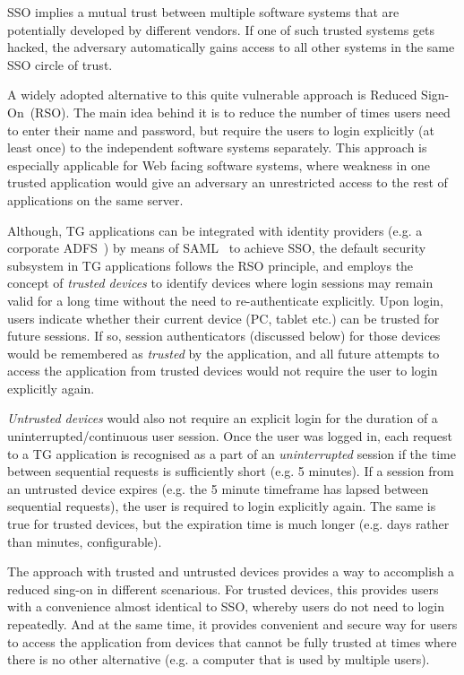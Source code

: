 \documentclass[a4paper,12pt,oneside,openright]{memoir}
\begin{document}
	SSO implies a mutual trust between multiple software systems that are potentially developed by different vendors.
	If one of such trusted systems gets hacked, the adversary automatically gains access to all other systems in the same SSO circle of trust.

	A widely adopted alternative to this quite vulnerable approach is Reduced Sign-On~(RSO).
	The main idea behind it is to reduce the number of times users need to enter their name and password, but require the users to login explicitly (at least once) to the independent software systems separately.
	This approach is especially applicable for Web facing software systems, where weakness in one trusted application would give an adversary an unrestricted access to the rest of applications on the same server.

	Although, TG applications can be integrated with identity providers (e.g. a corporate ADFS~\cite{ADFS}) by means of SAML~\cite{SAML} to achieve SSO, the default security subsystem in TG applications follows the RSO principle, and employs the concept of \emph{trusted devices} to identify devices where login sessions may remain valid for a long time without the need to re-authenticate explicitly.
	Upon login, users indicate whether their current device (PC, tablet etc.) can be trusted for future sessions.
	If so, session authenticators (discussed below) for those devices would be remembered as \emph{trusted} by the application, and all future attempts to access the application from trusted devices would not require the user to login explicitly again.

	\emph{Untrusted devices} would also not require an explicit login for the duration of a uninterrupted/continuous user session.
	Once the user was logged in, each request to a TG application is recognised as a part of an \emph{uninterrupted} session if the time between sequential requests is sufficiently short (e.g. 5 minutes).
	If a session from an untrusted device expires (e.g. the 5 minute timeframe has lapsed between sequential requests), the user is required to login explicitly again.
	The same is true for trusted devices, but the expiration time is much longer (e.g. days rather than minutes, configurable).

	The approach with trusted and untrusted devices provides a way to accomplish a reduced sing-on in different scenarious.
	For trusted devices, this provides users with a convenience almost identical to SSO, whereby users do not need to login repeatedly.
	And at the same time, it provides convenient and secure way for users to access the application from devices that cannot be fully trusted at times where there is no other alternative (e.g. a computer that is used by multiple users).
\end{document}
